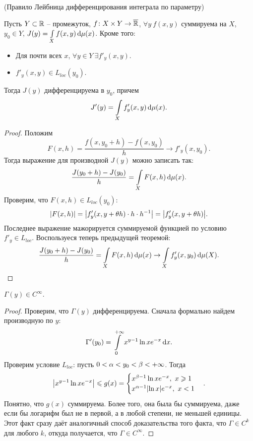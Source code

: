 \begin{theorem}(Правило Лейбница дифференцирования интеграла по параметру)

    Пусть $Y \subset \mathbb{R}$ -- промежуток, $f \colon X \times Y \to \overline{\mathbb{R}}$, $\forall y~ f(x, y)$
    суммируема на $X$, $y_0 \in Y$, $J(y) = \int\limits_X{f(x, y) \,\mathrm{d} \mu(x)}$. Кроме того:
    \begin{itemize}
        \item Для почти всех $x$, $\forall y \in Y~ \exists f'_y(x, y)$.
        \item $f'_y(x, y) \in L_{loc}(y_0)$.
    \end{itemize}
    Тогда $J(y)$ дифференцируема в $y_0$, причем
    \[
        J'(y) = \int\limits_X{f'_y(x, y) \,\mathrm{d} \mu(x)}
    .\]
\end{theorem}
\begin{proof}
    Положим
    \[
        F(x, h) = \frac{f(x, y_0 + h) - f(x, y_0)}{h} \to f'_y(x, y_0)
    .\]
    Тогда выражение для производной $J(y)$ можно записать так:
    \[
        \frac{J(y_0 + h) - J(y_0)}{h} = \int\limits_X{F(x, h) \,\mathrm{d} \mu(x)}
    .\]
    Проверим, что $F(x, h) \in L_{loc}(y_0)$:
    \[
        \abs*{F(x, h)} = \abs*{f'_y(x, y + \theta h) \cdot h \cdot h^{-1}} = \abs*{f'_y(x, y + \theta h)}
    .\]
    Последнее выражение мажорируется суммируемой функцией по условию $f'_y \in L_{loc}$.
    Воспользуеся теперь предыдущей теоремой:
    \[
        \frac{J(y_0 + h) - J(y_0)}{h} = \int\limits_X{F(x, h) \,\mathrm{d} \mu(x)} \to \int\limits_X{f'_y(x, y_0) \,\mathrm{d} \mu(X)}
    .\]
\end{proof}

\begin{example}
    $\Gamma(y) \in C^{\infty}$.
\end{example}
\begin{proof}
    Проверим, что $\Gamma(y)$ дифференцируема. Сначала формально найдем производную по $y$:
    \[
        \Gamma'(y_0) = \int\limits_0^{+\infty}{x^{y - 1} \ln{x} e^{-x} \,\mathrm{d} x} 
    .\]
    Проверим условие $L_{loc}$: пусть $0 < \alpha < y_0 < \beta < +\infty$. Тогда
    \[
        \abs*{x^{y - 1} \ln{x} e^{-x}} \leqslant g(x) = \begin{cases}
            x^{\b - 1} \ln{x} e^{-x},~ x \geqslant 1 \\
            x^{\a - 1} \abs*{\ln{x}} e^{-x},~ x < 1
        \end{cases}
    .\]
    Понятно, что $g(x)$ суммируема. Более того, она была бы суммируема, даже если бы
    логарифм был не в первой, а в любой степени, не меньшей единицы. Этот факт
    сразу даёт аналогичный способ доказательства того факта, что $\Gamma \in C^k$ для
    любого $k$, откуда получается, что $\Gamma \in C^\infty$.
\end{proof}

